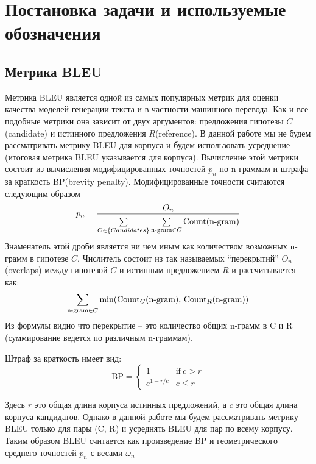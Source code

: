 \documentclass[14pt, a4paper]{extarticle}
\begin{document}
\section{Постановка задачи и используемые обозначения}

\subsection{Метрика BLEU}
Метрика BLEU является одной из самых популярных метрик для оценки качества моделей генерации текста и в частности машинного перевода. Как и все подобные метрики она зависит от двух аргументов: предложения гипотезы $C$(candidate)  и истинного предложения $R$(reference). В данной работе мы не будем рассматривать метрику BLEU для корпуса и будем использовать усреднение (итоговая метрика BLEU указывается для корпуса). 
Вычисление этой метрики состоит из вычисления модифицированных точностей $p_n$ по n-граммам и штрафа за краткость BP(brevity penalty). Модифицированные точности считаются следующим образом
\begin{equation}
p_n = \frac{O_n}{\sum\limits_{C \in \{Candidates\}}^{} \sum\limits_{\textnormal{n-gram} \in C} {\textnormal{Count(n-gram)}}}
\label{p_n}
\end{equation}
Знаменатель этой дроби является ни чем иным как количеством возможных n-грамм в гипотезе $C$. Числитель состоит из так называемых ``перекрытий'' $O_n$(overlaps)
 между гипотезой $C$ и истинным предложением $R$ и рассчитывается как:
\begin{equation}
\sum\limits_{\textnormal{n-gram} \in C} \textnormal{min(Count$_C$(n-gram), Count$_R$(n-gram))}
\label{Oprime}
\end{equation}
Из формулы видно что перекрытие -- это количество общих n-грамм в C и R (суммирование ведется по различным n-граммам). 

Штраф за краткость имеет вид:
\begin{equation}
\textrm{BP} =
\begin{cases}
1 & \text{if}\ c>r \\
e^{1 - r/c} & c \le r
\end{cases}
\end{equation}

Здесь $r$ это общая длина корпуса истинных предложений, а $c$ это общая длина корпуса кандидатов. Однако в данной работе мы будем рассматривать метрику BLEU только для пары (C, R) и усреднять BLEU для пар по всему корпусу.
Таким образом BLEU считается как произведение BP и геометрического среднего точностей $p_n$ с весами $\omega_n$
\end{document}
